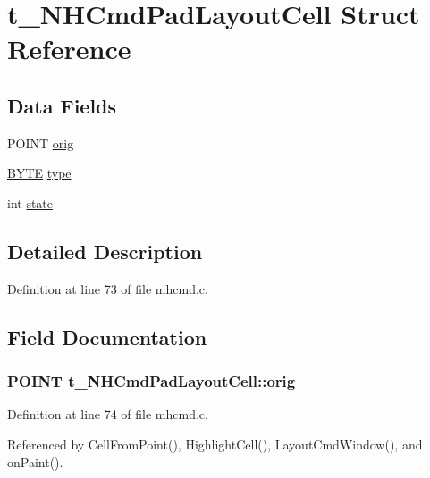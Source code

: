 \hypertarget{structt__NHCmdPadLayoutCell}{\section{t\+\_\+\+N\+H\+Cmd\+Pad\+Layout\+Cell Struct Reference}
\label{structt__NHCmdPadLayoutCell}
}
\subsection*{Data Fields}
\begin{DoxyCompactItemize}
\item 
P\+O\+I\+N\+T \hyperlink{structt__NHCmdPadLayoutCell_ae226ccfb394ed92889552b07763ba2d9}{orig}
\item 
\hyperlink{def__os2_8h_a4ae1dab0fb4b072a66584546209e7d58}{B\+Y\+T\+E} \hyperlink{structt__NHCmdPadLayoutCell_a1c2a64952d42eae523db51f2fef5afcc}{type}
\item 
int \hyperlink{structt__NHCmdPadLayoutCell_a9ed2eeb5f8a90c1517ebc2865a4890bb}{state}
\end{DoxyCompactItemize}


\subsection{Detailed Description}


Definition at line 73 of file mhcmd.\+c.



\subsection{Field Documentation}
\hypertarget{structt__NHCmdPadLayoutCell_ae226ccfb394ed92889552b07763ba2d9}{
\subsubsection[{orig}]{\setlength{\rightskip}{0pt plus 5cm}P\+O\+I\+N\+T t\+\_\+\+N\+H\+Cmd\+Pad\+Layout\+Cell\+::orig}}\label{structt__NHCmdPadLayoutCell_ae226ccfb394ed92889552b07763ba2d9}


Definition at line 74 of file mhcmd.\+c.



Referenced by Cell\+From\+Point(), Highlight\+Cell(), Layout\+Cmd\+Window(), and on\+Paint().

